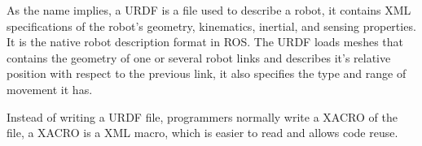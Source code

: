 As the name implies, a URDF is a file used to describe a robot, it contains XML specifications of the robot's geometry, kinematics, inertial, and sensing properties. It is the native robot description format in ROS. The URDF loads meshes that contains the geometry of one or several robot links and describes it's relative position with respect to the previous link, it also specifies the type and range of movement it has.

Instead of writing a URDF file, programmers normally write a XACRO of the file, a XACRO is a XML macro, which is easier to read and allows code reuse. 